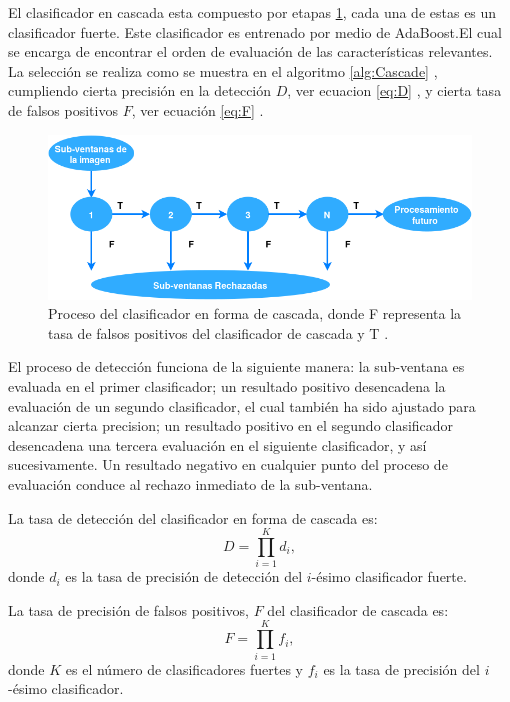 El clasificador en cascada  esta compuesto por etapas \ref{fig:Cascade}, cada una de estas es un clasificador fuerte. Este clasificador es entrenado por medio de AdaBoost.El cual se encarga de encontrar el orden de evaluación de las características relevantes. \\
La selección se realiza como se muestra en el algoritmo \ref{alg:Cascade} , cumpliendo cierta precisión en la detección $D$, ver ecuacion \ref{eq:D} , y cierta tasa de falsos positivos $F$, ver ecuación \ref{eq:F} .

\begin{figure}[h!]
\begin{center}
\includegraphics[scale=.60]{./Figures/DCascade.png}
\end{center}
\caption{Proceso del clasificador en forma de cascada, donde F representa la tasa de falsos positivos del clasificador de cascada y T .}
\label{fig:Cascade}
\end{figure}

El proceso de detección funciona de la siguiente manera: la sub-ventana es evaluada en el primer clasificador; un resultado positivo desencadena la evaluación de un segundo clasificador, el cual también ha sido ajustado para alcanzar cierta precision; un resultado positivo en el segundo clasificador desencadena una tercera evaluación en el siguiente clasificador, y así sucesivamente. Un resultado negativo en cualquier punto del proceso de evaluación conduce al rechazo inmediato de la sub-ventana.

La tasa de detección del clasificador en forma de cascada es: 
\begin{equation} \label{eq:D}
D = \prod^K_{i=1} d_i ,
\end{equation}
donde $d_i$ es la tasa de precisión de detección del $i$-ésimo clasificador fuerte.  

La tasa de precisión de falsos positivos, $F$ del clasificador de cascada es: 
\begin{equation} \label{eq:F}
F = \prod^K_{i=1} f_i ,
\end{equation}
donde $K$ es el número de clasificadores fuertes y $f_i$ es la tasa de precisión del $i$-ésimo clasificador. 

